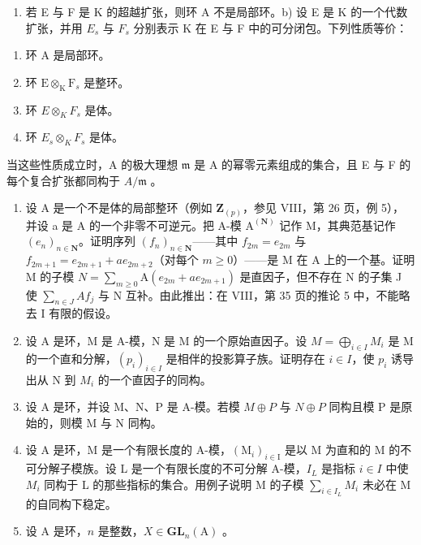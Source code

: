 \begin{enumerate}
\def\labelenumi{\alph{enumi})}
\tightlist
\item
  若 E 与 F 是 K 的超越扩张，则环 A 不是局部环。b) 设 E 是 K 的一个代数扩张，并用 \(E_{s}\) 与 \(F_{s}\) 分别表示 K 在 E 与 F 中的可分闭包。下列性质等价：
\end{enumerate}

\begin{enumerate}
\def\labelenumi{(\roman{enumi})}
\item
  环 A 是局部环。
\item
  环 \(\mathrm{E}\otimes_{\mathrm{K}}\mathrm{F}_s\) 是整环。
\item
  环 \(E \otimes_{K} F_{s}\) 是体。
\item
  环 \(E_{s} \otimes_{K} F_{s}\) 是体。
\end{enumerate}

当这些性质成立时，A 的极大理想 \(\mathfrak{m}\) 是 A 的幂零元素组成的集合，且 E 与 F 的每个复合扩张都同构于 \(A / \mathfrak{m}\) 。

\begin{enumerate}
\def\labelenumi{\arabic{enumi})}
\setcounter{enumi}{12}
\item
  设 A 是一个不是体的局部整环（例如 \(\mathbf{Z}_{(p)}\)，参见 VIII，第 26 页，例 5），并设 a 是 A 的一个非零不可逆元。把 A-模 \(\mathrm{A}^{(\mathbf{N})}\) 记作 M，其典范基记作 \((e_{n})_{n\in\mathbf{N}}\)。证明序列 \((f_{n})_{n\in\mathbf{N}}\)——其中 \(f_{2m}=e_{2m}\) 与 \(f_{2m+1}=e_{2m+1}+ae_{2m+2}\)（对每个 \(m\geqslant0\)）——是 M 在 A 上的一个基。证明 M 的子模 \(N=\sum_{m\geqslant0}\mathrm{A}(e_{2m}+ae_{2m+1})\) 是直因子，但不存在 N 的子集 J 使 \(\sum_{n\in J}Af_{j}\) 与 N 互补。由此推出：在 VIII，第 35 页的推论 5 中，不能略去 I 有限的假设。
\item
  设 A 是环，M 是 A-模，N 是 M 的一个原始直因子。设 \(M = \bigoplus_{i \in I} M_i\) 是 M 的一个直和分解，\((p_i)_{i \in I}\) 是相伴的投影算子族。证明存在 \(i \in I\)，使 \(p_i\) 诱导出从 N 到 \(M_i\) 的一个直因子的同构。
\item
  设 A 是环，并设 M、N、P 是 A-模。若模 \(M \oplus P\) 与 \(N \oplus P\) 同构且模 P 是原始的，则模 M 与 N 同构。
\item
  设 A 是环，M 是一个有限长度的 A-模，\((\mathrm{M}_{i})_{i\in\mathrm{I}}\) 是以 M 为直和的 M 的不可分解子模族。设 L 是一个有限长度的不可分解 A-模，\(I_{L}\) 是指标 \(i\in I\) 中使 \(M_{i}\) 同构于 L 的那些指标的集合。用例子说明 M 的子模 \(\sum_{i\in I_{L}}M_{i}\) 未必在 M 的自同构下稳定。
\item
  设 \(\mathrm{A}\) 是环，\(n\) 是整数，\(X \in \mathbf{GL}_n(\mathrm{A})\) 。
\end{enumerate}

